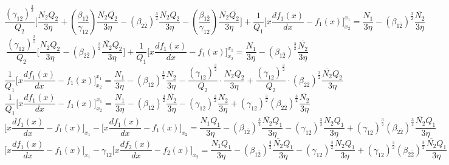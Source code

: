 \documentclass[fleqn, 10pt]{article}
\begin{document}
            \begin{equation*}
                \frac{(\gamma_{12})^\frac{3}{2}}{Q_2} \biggl[\frac{N_2Q_2}{3\eta} + \left(\frac{\beta_{1\overline{2}}}{\gamma_{12}}\right)\frac{\overline{N_2}\overline{Q_2}}{3\eta} - (\beta_{2\overline{2}})^\frac{3}{2}\frac{\overline{N_2}Q_2}{3\eta} - \left(\frac{\beta_{1\overline{2}}}{\gamma_{12}}\right)\frac{\overline{N_2}\overline{Q_2}}{3\eta}\biggr] + \frac{1}{Q_1} \biggl[x\frac{df_1(x)}{dx} - f_1(x)\biggr]^{x_1}_{x_2} = \frac{N_1}{3\eta} - (\beta_{1\overline{2}})^\frac{3}{2}\frac{\overline{N_2}}{3\eta}
            \end{equation*}
            \begin{equation*}
                \frac{(\gamma_{12})^\frac{3}{2}}{Q_2} \biggl[\frac{N_2Q_2}{3\eta} - (\beta_{2\overline{2}})^\frac{3}{2}\frac{\overline{N_2}Q_2}{3\eta}\biggr] + \frac{1}{Q_1} \biggl[x\frac{df_1(x)}{dx} - f_1(x) \biggr]^{x_1}_{x_2} = \frac{N_1}{3\eta} - (\beta_{1\overline{2}})^\frac{3}{2}\frac{\overline{N_2}}{3\eta}
            \end{equation*}
            \begin{equation*}
                \frac{1}{Q_1} \biggl[x\frac{df_1(x)}{dx}-f_1(x)\biggr]^{x_1}_{x_2} = \frac{N_1}{3\eta} - (\beta_{1\overline{2}})^\frac{3}{2}\frac{\overline{N_2}}{3\eta}-\frac{(\gamma_{12})^\frac{3}{2}}{Q_2}\cdot\frac{N_2Q_2}{3\eta}+\frac{(\gamma_{12})^\frac{3}{2}}{Q_2}\cdot(\beta_{2\overline{2}})^\frac{3}{2}\frac{\overline{N_2}Q_2}{3\eta}
            \end{equation*}
            \begin{equation*}
                \frac{1}{Q_1}\bigg[x\frac{df_1(x)}{dx}-f_1(x)\biggr]^{x_1}_{x_2} = \frac{N_1}{3\eta} - (\beta_{1\overline{2}})^\frac{3}{2}\frac{\overline{N_2}}{3\eta}-(\gamma_{12})^\frac{3}{2}\frac{N_2}{3\eta}+(\gamma_{12})^\frac{3}{2}(\beta_{2\overline{2}})^\frac{3}{2}\frac{\overline{N_2}}{3\eta}
            \end{equation*}
            \begin{equation*}
                \biggl[x\frac{df_1(x)}{dx}-f_1(x)\biggr]_{x_1}-\biggl[x\frac{df_1(x)}{dx}-f_1(x)\biggr]_{x_2} = \frac{N_1Q_1}{3\eta}-(\beta_{1\overline{2}})^\frac{3}{2}\frac{\overline{N_2}Q_1}{3\eta}-(\gamma_{12})^\frac{3}{2}\frac{N_2Q_1}{3\eta} + (\gamma_{12})^\frac{3}{2} (\beta_{2\overline{2}})^\frac{3}{2}\frac{\overline{N_2}Q_1}{3\eta}
            \end{equation*}
            \begin{equation*}
                \biggl[x\frac{df_1(x)}{dx}-f_1(x)\biggr]_{x_1} - \gamma_{12}\biggl[x\frac{df_2(x)}{dx}-f_2(x)\biggr]_{x_2} = \frac{N_1Q_1}{3\eta}-(\beta_{1\overline{2}})^\frac{3}{2}\frac{\overline{N_2}Q_1}{3\eta}-(\gamma_{12})^\frac{3}{2}\frac{N_2Q_1}{3\eta}+(\gamma_{12})^\frac{3}{2}(\beta_{2\overline{2}})^\frac{3}{2} \frac{\overline{N_2}Q_1}{3\eta}
            \end{equation*}
\end{document}
